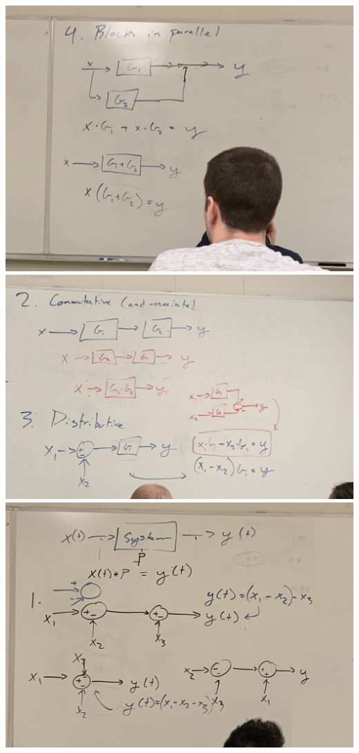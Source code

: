 \documentclass[11pt]{book}
\begin{document}
\\
\includegraphics[width=\textwidth]{figures/3_26_4.jpg}
\\
\includegraphics[width=\textwidth]{figures/3_26_5.jpg}
\\
\includegraphics[width=\textwidth]{figures/3_26_6.jpg}
\end{document}
